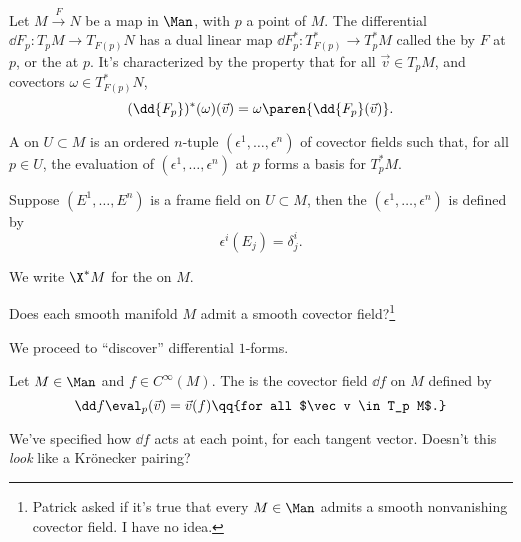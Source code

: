 \begin{defn}
   Let $M \xrightarrow{F} N$ be a map in $\Man$, with $p$ a point of $M$. The differential $\dd { F_p } \colon T_p M \to T_{F(p)} N$ has a dual linear map $\dd { F^*_p } \colon T^*_{F(p)} \to T^*_p M$ called the  by $F$ at $p$, or the  at $p$. It's characterized by the property that for all $\vec v \in T_p M$, and covectors $\omega \in T^*_{F(p)} N$,
   \[
      (\dd { F_p })^*(\omega)(\vec v) = \omega \paren{\dd { F_p }(\vec v)}.
   \]
\end{defn}

\begin{defn}
    A  on $U \subset M$ is an ordered $n$-tuple $(\epsilon^1, \ldots, \epsilon^n)$ of covector fields such that, for all $p \in U$, the evaluation of $(\epsilon^1, \ldots, \epsilon^n)$  at $p$ forms a basis for $T^*_p M$.

    Suppose $(E^1, \ldots, E^n)$ is a frame field on $U \subset M$, then the  $(\epsilon^1, \ldots, \epsilon^n)$ is defined by
    \[
        \epsilon^i(E_j) = \delta^i_j.
    \]
    
We write $\X^* M$ for the  on $M$.
\end{defn}

\begin{todo}[] Does each smooth manifold $M$ admit a smooth covector field?\footnote{Patrick asked if it's true that every $M \in \Man$ admits a smooth nonvanishing covector field. I have no idea.}
\end{todo}

We proceed to ``discover'' differential $1$-forms.

\begin{defn}
   Let $M \in \Man$ and $f \in C^\infty(M)$. The  is the covector field $\dd f$ on $M$ defined by
   \[
      \dd f \eval_p (\vec v) = \vec v (f) \qq{for all $\vec v \in T_p M$.}
   \]
\end{defn}

   We've specified how $ \dd f$ acts at each point, for each tangent vector. Doesn't this \emph{look} like a Krönecker pairing?

